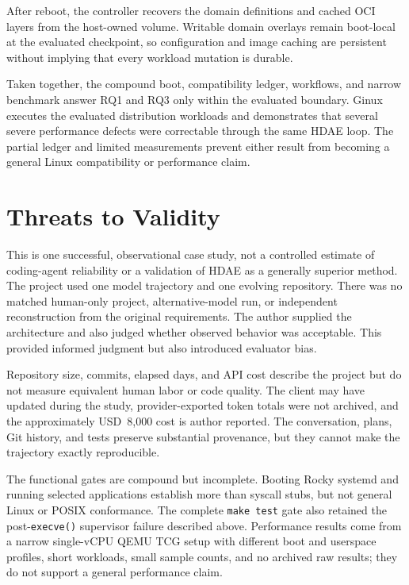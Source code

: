 \documentclass[11pt]{article}
\begin{document}
After reboot, the controller recovers the domain definitions and cached OCI
layers from the host-owned volume. Writable domain overlays remain boot-local
at the evaluated checkpoint, so configuration and image caching are persistent
without implying that every workload mutation is durable.

Taken together, the compound boot, compatibility ledger, workflows, and narrow
benchmark answer RQ1 and RQ3 only within the evaluated boundary. Ginux executes
the evaluated distribution workloads and demonstrates that several severe performance
defects were correctable through the same HDAE loop. The partial ledger and
limited measurements prevent either result from becoming a general Linux
compatibility or performance claim.

\section{Threats to Validity}

This is one successful, observational case study, not a controlled estimate of
coding-agent reliability or a validation of HDAE as a generally superior
method. The project used one model trajectory and one evolving repository.
There was no matched human-only project, alternative-model run, or
independent reconstruction from the original requirements. The author supplied
the architecture and also judged whether observed behavior was acceptable. This
provided informed judgment but also introduced evaluator bias.

Repository size, commits, elapsed days, and API cost describe the project but
do not measure equivalent human labor or code quality. The client may have
updated during the study, provider-exported token totals were not archived, and
the approximately USD~8,000 cost is author reported. The conversation, plans,
Git history, and tests preserve substantial provenance, but they cannot make the
trajectory exactly reproducible.

The functional gates are compound but incomplete. Booting Rocky systemd and
running selected applications establish more than syscall stubs, but not
general Linux or POSIX conformance. The complete \texttt{make test} gate also
retained the post-\texttt{execve()} supervisor failure described above.
Performance results come from a narrow single-vCPU QEMU TCG setup with
different boot and userspace profiles, short workloads, small sample counts,
and no archived raw results; they do not support a general performance claim.
\end{document}
